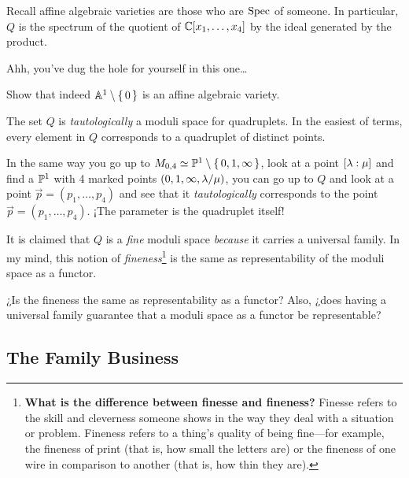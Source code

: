 \documentclass[12pt]{memoir}
\begin{document}
\begin{Rmk}
    Recall affine algebraic varieties are those who are $\operatorname{Spec}$ of someone. In particular, $Q$ is the spectrum of the quotient of $\mathbb{C}[x_1,\dots,x_4]$ by the ideal generated by the product.
\end{Rmk}

Ahh, you've dug the hole for yourself in this one\dots

\begin{Ej}
    Show that indeed $\mathbb{A}^1\setminus\{\,0\,\}$ is an affine algebraic variety.
\end{Ej}

The set $Q$ is \emph{tautologically} a moduli space for quadruplets. In the easiest of terms, every element in $Q$ corresponds to a quadruplet of distinct points.\par
In the same way you go up to $M_{0,4}\simeq\mathbb{P}^1\setminus\{\,0,1,\infty\,\}$, look at a point $[\lambda:\mu]$ and find a $\mathbb{P}^1$ with 4 marked points $(0,1,\infty,\lambda/\mu)$, you can go up to $Q$ and look at a point $\vec{p}=(p_1,\dots,p_4)$ and see that it \emph{tautologically} corresponds to the point $\vec p=(p_1,\dots,p_4)$. ¡The parameter is the quadruplet itself!\par 
It is claimed that $Q$ is a \emph{fine} moduli space \emph{because} it carries a universal family. In my mind, this notion of \emph{fineness}\footnote{\textbf{What is the difference between finesse and fineness?}
Finesse refers to the skill and cleverness someone shows in the way they deal with a situation or problem. Fineness refers to a thing's quality of being fine—for example, the fineness of print (that is, how small the letters are) or the fineness of one wire in comparison to another (that is, how thin they are).} is the same as representability of the moduli space as a functor. 

\begin{Ej}
    ¿Is the fineness the same as representability as a functor? Also, ¿does having a universal family guarantee that a moduli space as a functor be representable?
\end{Ej}

\subsection{The Family Business}
\end{document}

